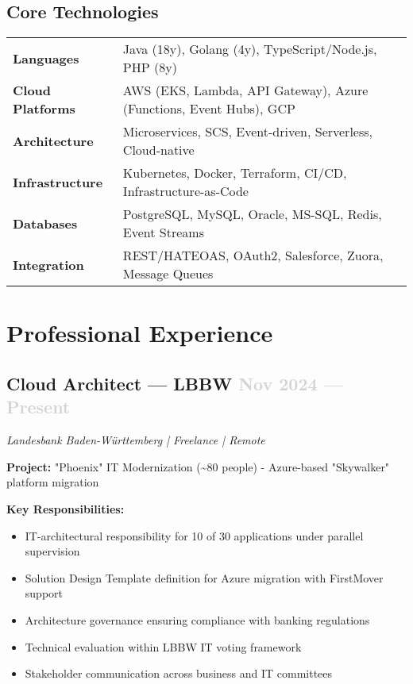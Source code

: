 \documentclass[11pt,a4paper]{article}
\begin{document}
\subsection{Core Technologies}
\begin{tabularx}{\textwidth}{p{}p{}p{}}
\textbf{Languages} & Java (18y), Golang (4y), TypeScript/Node.js, PHP (8y) \\
\textbf{Cloud Platforms} & AWS (EKS, Lambda, API Gateway), Azure (Functions, Event Hubs), GCP \\
\textbf{Architecture} & Microservices, SCS, Event-driven, Serverless, Cloud-native \\
\textbf{Infrastructure} & Kubernetes, Docker, Terraform, CI/CD, Infrastructure-as-Code \\
\textbf{Databases} & PostgreSQL, MySQL, Oracle, MS-SQL, Redis, Event Streams \\
\textbf{Integration} & REST/HATEOAS, OAuth2, Salesforce, Zuora, Message Queues
\end{tabularx}

\vspace{8pt}

\section{Professional Experience}

\subsection{Cloud Architect — LBBW \hfill \textcolor{lightgray}{Nov 2024 — Present}}
\textsl{Landesbank Baden-Württemberg | Freelance | Remote}

\textbf{Project:} "Phoenix" IT Modernization (\textasciitilde{}80 people) - Azure-based "Skywalker" platform migration

\textbf{Key Responsibilities:}
\begin{itemize}
    \item IT-architectural responsibility for 10 of 30 applications under parallel supervision
    \item Solution Design Template definition for Azure migration with FirstMover support
    \item Architecture governance ensuring compliance with banking regulations
    \item Technical evaluation within LBBW IT voting framework
    \item Stakeholder communication across business and IT committees
\end{itemize}
\end{document}
